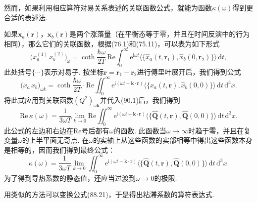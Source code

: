 然而，如果利用相应算符对易关系表述的关联函数公式，就能为函数$\kappa(\omega)$得到更合适的表述法.

如果$\bm{x}_{a}(\bm{r})$，$\bm{x}_{b}(\bm{r})$是两个涨落量（在平衡态等于零，并且在时间反演中的行为相同），那么它们的关联函数，根据(76.1)和(75.11)，可以表为如下形式
\begin{equation*}
\bigl(x^{(1)}_{a}\,x^{(2)}_{b}\bigr)_{\omega}=\coth\frac{\hbar\omega}{2T}\,\mathrm{Re}\int_{0}^{\infty}\mathrm{e}^{\mathrm{i}\omega t}\bigl\langle\bigl\{\hat{x}_{a}(t,\bm{r}_{1}),\hat{x}_{b}(0,\bm{r}_{2})\bigr\}\bigr\rangle\,\mathrm{d}t,
\end{equation*}
此处括号$\{\cdots\}$表示对易子. 按坐标$\bm{r}=\bm{r}_{1}-\bm{r}_{2}$进行傅里叶展开后，我们得到公式
\begin{equation}
\bigl(x_{a}\,x_{b}\bigr)_{\omega k}=\coth\frac{\hbar\omega}{2T}\cdot\mathrm{Re}\iint_{0}^{\infty}\mathrm{e}^{\mathrm{i}(\omega t-\bm{k}\cdot\bm{r})}\bigl\langle\bigl\{\hat{x}_{a}(t,\bm{r}),\hat{x}_{b}(0,0)\bigr\}\bigr\rangle\,\mathrm{d}t\,\mathrm{d}^{3}x.
\end{equation}
将此式应用到关联函数$(Q^{2})_{\omega\bm{k}}$并代入(90.1)后，我们得到
\begin{equation*}
\mathrm{Re}\,\kappa(\omega)=\frac{1}{3\omega T}\lim_{k\to0}\mathrm{Re}\iint_{0}^{\infty}\mathrm{e}^{\mathrm{i}(\omega t-\bm{k}\cdot\bm{r})}\bigl\langle\bigl\{\hat{\bm{Q}}(t,\bm{r}),\hat{\bm{Q}}(0,0)\bigr\}\bigr\rangle\,\mathrm{d}t\,\mathrm{d}^{3}x.
\end{equation*}
此公式的左边和右边在$\mathrm{Re}$号后都有$\omega$的函数. 此函数当$\omega\to\infty$时趋于零，并且在复变量$\omega$的上半平面无奇点. 在$\omega$的实轴上从这些函数的实部相等中得出这些函数本身是相等的，因而我们得到最终公式：
\begin{equation}
\kappa(\omega)=\frac{1}{3\omega T}\lim_{k\to0}\iint_{0}^{\infty}\mathrm{e}^{\mathrm{i}(\omega t-\bm{k}\cdot\bm{r})}\bigl\langle\bigl\{\hat{\bm{Q}}(t,\bm{r}),\hat{\bm{Q}}(0,0)\bigr\}\bigr\rangle\,\mathrm{d}t\,\mathrm{d}^{3}x.
\end{equation}
为了得到导热系数的静态值，还应当过渡到$\omega\to0$的极限.

用类似的方法可以变换公式(88.21)，于是得出粘滞系数的算符表达式.

